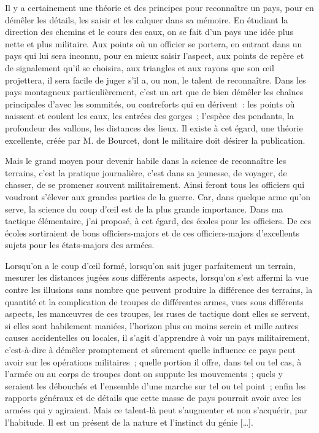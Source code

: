 \documentclass[french,twoside]{book} %
\begin{document}
Il y a certainement une théorie et des principes pour reconnaître un pays, pour en démêler les détails, les saisir et les calquer dans sa mémoire. En étudiant la direction des chemins et le cours des eaux, on se fait d’un pays une idée plus nette et plus militaire. Aux points où un officier se portera, en entrant dans un pays qui lui sera inconnu, pour en mieux saisir l’aspect, aux points de repère et de signalement qu’il se choisira, aux triangles et aux rayons que son œil projettera, il sera facile de juger s’il a, ou non, le talent de reconnaître. Dans les pays montagneux particulièrement, c’est un art que de bien démêler les chaînes principales d’avec les sommités, ou contreforts qui en dérivent : les points où naissent et coulent les eaux, les entrées des gorges ; l’espèce des pendants, la profondeur des vallons, les distances des lieux. Il existe à cet égard, une théorie excellente, créée par M. de Bourcet, dont le militaire doit désirer la publication.\par
Mais le grand moyen pour devenir habile dans la science de reconnaître les terrains, c’est la pratique journalière, c’est dans sa jeunesse, de voyager, de chasser, de se promener souvent militairement. Ainsi feront tous les officiers qui voudront s’élever aux grandes parties de la guerre. Car, dans quelque arme qu’on serve, la science du coup d’œil est de la plus grande importance. Dans ma tactique élémentaire, j’ai proposé, à cet égard, des écoles pour les officiers. De ces écoles sortiraient de bons officiers-majors et de ces officiers-majors d’excellents sujets pour les états-majors des armées.\par
Lorsqu’on a le coup d’œil formé, lorsqu’on sait juger parfaitement un terrain, mesurer les distances jugées sous différents aspects, lorsqu’on s’est affermi la vue contre les illusions sans nombre que peuvent produire la différence des terrains, la quantité et la complication de troupes de différentes armes, vues sous différents aspects, les manœuvres de ces troupes, les ruses de tactique dont elles se servent, si elles sont habilement maniées, l’horizon plus ou moins serein et mille autres causes accidentelles ou locales, il s’agit d’apprendre à voir un pays militairement, c’est-à-dire à démêler promptement et sûrement quelle influence ce pays peut avoir sur les opérations militaires ; quelle portion il offre, dans tel ou tel cas, à l’armée ou au corps de troupes dont on suppute les mouvements ; quels y seraient les débouchés et l’ensemble d’une marche sur tel ou tel point ; enfin les rapports généraux et de détails que cette masse de pays pourrait avoir avec les armées qui y agiraient. Mais ce talent-là peut s’augmenter et non s’acquérir, par l’habitude. Il est un présent de la nature et l’instinct du génie […].\par
\end{document}
